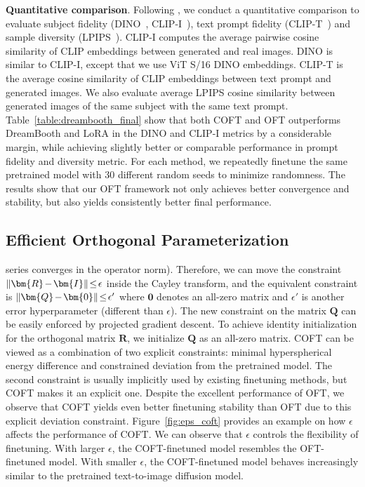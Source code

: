 \textbf{Quantitative comparison}. Following \cite{ruiz2023dreambooth}, we conduct a quantitative comparison to evaluate subject fidelity (DINO~\cite{caron2021emerging}, CLIP-I~\cite{radford2021learning}), text prompt fidelity (CLIP-T~\cite{radford2021learning}) and sample diversity (LPIPS~\cite{zhang2018unreasonable}). CLIP-I computes the average pairwise cosine similarity of CLIP embeddings between generated and real images. DINO is similar to CLIP-I, except that we use ViT S/16 DINO embeddings. CLIP-T is the average cosine similarity of CLIP embeddings between text prompt and generated images. We also evaluate average LPIPS cosine similarity between generated images of the same subject with the same text prompt. Table~\ref{table:dreambooth_final} show that both COFT and OFT outperforms DreamBooth and LoRA in the DINO and CLIP-I metrics by a considerable margin, while achieving slightly better or comparable performance in prompt fidelity and diversity metric. For each method, we repeatedly finetune the same pretrained model with 30 different random seeds to minimize randomness. The results show that our OFT framework not only achieves better convergence and stability, but also yields consistently better final performance.

\subsection{Efficient Orthogonal Parameterization}\label{sect:eff_ortho}

series converges in the operator norm). Therefore, we can move the constraint $\thickmuskip=2mu \medmuskip=2mu\|\bm{R}-\bm{I}\|\leq\epsilon$ inside the Cayley transform, and the equivalent constraint is $\thickmuskip=2mu \medmuskip=2mu \|\bm{Q}-\bm{0}\|\leq\epsilon'$ where $\bm{0}$ denotes an all-zero matrix and $\epsilon'$ is another error hyperparameter (different than $\epsilon$). The new constraint on the matrix $\bm{Q}$ can be easily enforced by projected gradient descent. To achieve identity initialization for the orthogonal matrix $\bm{R}$, we initialize $\bm{Q}$ as an all-zero matrix. COFT can be viewed as a combination of two explicit constraints: minimal hyperspherical energy difference and constrained deviation from the pretrained model. The second constraint is usually implicitly used by existing finetuning methods, but COFT makes it an explicit one. Despite the excellent performance of OFT, we observe that COFT yields even better finetuning stability than OFT due to this explicit deviation constraint. Figure~\ref{fig:eps_coft} provides an example on how $\epsilon$ affects the performance of COFT. We can observe that $\epsilon$ controls the flexibility of finetuning. With larger $\epsilon$, the COFT-finetuned model resembles the OFT-finetuned model. With smaller $\epsilon$, the COFT-finetuned model behaves increasingly similar to the pretrained text-to-image diffusion model.

